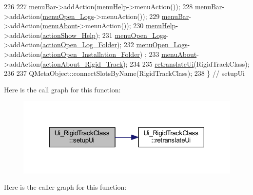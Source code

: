\begin{DoxyCode}
226 
227         \hyperlink{class_ui___rigid_track_class_ae5991e1872fe74ac542cf0fdca8d4d0e}{menuBar}->addAction(\hyperlink{class_ui___rigid_track_class_a2df43c6bb7db7e366a64bc8dbbbab7cc}{menuHelp}->menuAction());
228         \hyperlink{class_ui___rigid_track_class_ae5991e1872fe74ac542cf0fdca8d4d0e}{menuBar}->addAction(\hyperlink{class_ui___rigid_track_class_a1df91ff9df043558cf6d3c1dd6557250}{menuOpen\_Logs}->menuAction());
229         \hyperlink{class_ui___rigid_track_class_ae5991e1872fe74ac542cf0fdca8d4d0e}{menuBar}->addAction(\hyperlink{class_ui___rigid_track_class_a4c36fbc72f56540b472d7a8724690896}{menuAbout}->menuAction());
230         \hyperlink{class_ui___rigid_track_class_a2df43c6bb7db7e366a64bc8dbbbab7cc}{menuHelp}->addAction(\hyperlink{class_ui___rigid_track_class_aeb9fefc5e71112c520ae22f6e818d01f}{actionShow\_Help});
231         \hyperlink{class_ui___rigid_track_class_a1df91ff9df043558cf6d3c1dd6557250}{menuOpen\_Logs}->addAction(\hyperlink{class_ui___rigid_track_class_a3fb674ec6f96c57d3eef03900b7162ba}{actionOpen\_Log\_Folder});
232         \hyperlink{class_ui___rigid_track_class_a1df91ff9df043558cf6d3c1dd6557250}{menuOpen\_Logs}->addAction(\hyperlink{class_ui___rigid_track_class_adbf50ad17608dbfe8a688dc8f18d1ec3}{actionOpen\_Installation\_Folder})
      ;
233         \hyperlink{class_ui___rigid_track_class_a4c36fbc72f56540b472d7a8724690896}{menuAbout}->addAction(\hyperlink{class_ui___rigid_track_class_adc074cede51e875e17c38bf23375550a}{actionAbout\_Rigid\_Track});
234 
235         \hyperlink{class_ui___rigid_track_class_a7c96951c4e173848e7695d6bd7883af6}{retranslateUi}(RigidTrackClass);
236 
237         QMetaObject::connectSlotsByName(RigidTrackClass);
238     \} \textcolor{comment}{// setupUi}
\end{DoxyCode}
Here is the call graph for this function\+:\nopagebreak
\begin{figure}[H]
\begin{center}
\leavevmode
\includegraphics[width=318pt]{class_ui___rigid_track_class_a7f78fefc15716049b873bef4d3450e38_cgraph}
\end{center}
\end{figure}
Here is the caller graph for this function\+:\nopagebreak
